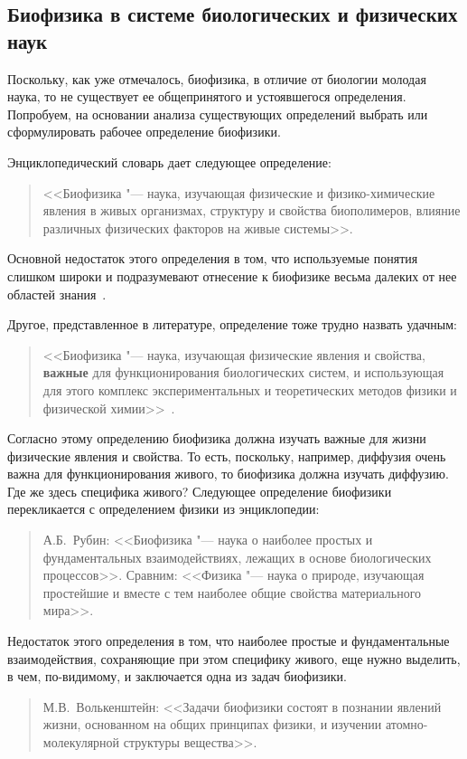 \documentclass[12pt,a4paper,oneside]{book}
\begin{document}
\subsection{Биофизика в системе биологических и физических наук}

Поскольку, как уже отмечалось, биофизика, в отличие от биологии молодая наука, то не существует ее общепринятого и устоявшегося определения. Попробуем, на основании анализа существующих определений выбрать или сформулировать рабочее определение биофизики.

Энциклопедический словарь дает следующее определение:
\begin{quote}
<<Биофизика "--- наука, изучающая физические и физико-химические явления в живых организмах, структуру и свойства биополимеров, влияние различных физических факторов на живые системы>>.
\end{quote}

Основной недостаток этого определения в том, что используемые понятия слишком широки и подразумевают отнесение к биофизике весьма далеких от нее областей знания~\cite{Popova2003}.

Другое, представленное в литературе, определение тоже трудно назвать удачным:
\begin{quote}
<<Биофизика "--- наука, изучающая физические явления и свойства, {\bf важные} для функционирования биологических систем, и использующая для этого комплекс экспериментальных и теоретических методов физики и физической химии>>~\cite{Meshalkin2000}.
\end{quote}

Согласно этому определению биофизика должна изучать важные для жизни физические явления и свойства. То есть, поскольку, например, диффузия очень важна для функционирования живого, то биофизика должна изучать диффузию. Где же здесь специфика живого? Следующее определение биофизики перекликается с определением физики из энциклопедии:
\begin{quote}
А.Б.~Рубин: <<Биофизика "--- наука о наиболее простых и фундаментальных взаимодействиях, лежащих в основе биологических процессов>>. Сравним: <<Физика "--- наука о природе, изучающая простейшие и вместе с тем наиболее общие свойства материального мира>>.
\end{quote}

Недостаток этого определения в том, что наиболее простые и фундаментальные взаимодействия, сохраняющие при этом специфику живого, еще нужно выделить, в чем, по-видимому, и заключается одна из задач биофизики.
\begin{quote}
М.В.~Волькенштейн: <<Задачи биофизики состоят в познании явлений жизни, основанном на общих принципах физики, и изучении атомно-молекулярной структуры вещества>>.
\end{quote}
\end{document}
